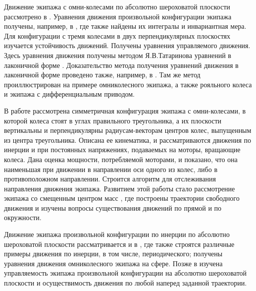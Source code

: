 Движение экипажа с омни-колесами по абсолютно шероховатой плоскости рассмотрено в \cite{ZobovaTatarinovAspecty2006,ZobovaTatarinov2009,zobova2008svobodnye8020851,ZobovaTatarinovPMM,Zobova2011e}. Уравнения движения произвольной конфигурации экипажа получены, например, в \cite{ZobovaTatarinov2009}, где также найдены их интегралы и инвариантная мера. Для конфигурации с тремя колесами в двух перпендикулярных плоскостях изучается устойчивость движений. Получены уравнения управляемого движения. Здесь уравнения движения получены методом Я.В.Татаринова уравнений в лаконичной форме \cite{Tatarinov,Tatarinov2005}. Доказательство метода получения уравнений движения в лаконичной форме проведено также, например, в \cite{Zobova2011}. Там же метод проиллюстрирован на примере омниколесного экипажа, а также рояльного колеса и экипажа с дифференциальным приводом.

В работе \cite{MartynenkoFormalskii2007,formalskii} рассмотрена симметричная конфигурация экипажа с омни-колесами, в которой колеса стоят в углах правильного треугольника, а их плоскости вертикальны и перпендикулярны радиусам-векторам центров колес, выпущенным из центра треугольника. Описана ее кинематика, и рассматриваются движения по инерции и при постоянных напряжениях, подаваемых на моторы, вращающие колеса. Дана оценка мощности, потребляемой моторами, и показано, что она наименьшая при движении в направлении оси одного из колес, либо в противоположном направлении. Строится алгоритм для отслеживания направления движения экипажа. Развитием этой работы стало рассмотрение экипажа со смещенным центром масс \cite{Martynenko2010_rus,Martynenko2010}, где построены траектории свободного движения и изучены вопросы существования движений по прямой и по окружности.

Движение экипажа произвольной конфигурации по инерции по абсолютно шероховатой плоскости рассматривается и в \cite{Borisov2011}, где также строятся различные примеры движения по инерции, в том числе, периодического; получены уравнения движения омниколесного экипажа на сфере. Позже в \cite{KilinBobykin2014} изучена управляемость экипажа произвольной конфигурации на абсолютно шероховатой плоскости и осуществимость движения по любой наперед заданной траектории.

